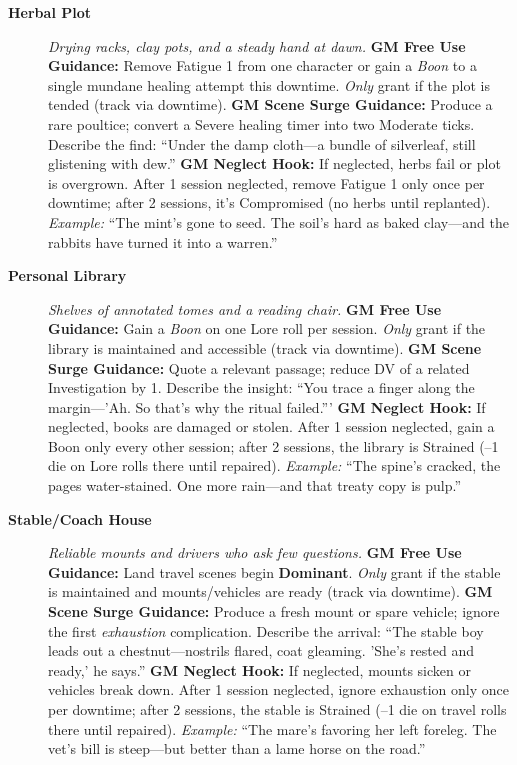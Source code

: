 \begin{description}
  \item[\textbf{Herbal Plot}]   
        \emph{Drying racks, clay pots, and a steady hand at dawn.}  
        \textbf{GM Free Use Guidance:} Remove Fatigue 1 from one character or gain a \emph{Boon} to a single mundane healing attempt this downtime. \emph{Only} grant if the plot is tended (track via downtime).  
        \textbf{GM Scene Surge Guidance:} Produce a rare poultice; convert a Severe healing timer into two Moderate ticks. Describe the find: ``Under the damp cloth---a bundle of silverleaf, still glistening with dew.''  
        \textbf{GM Neglect Hook:} If neglected, herbs fail or plot is overgrown. After 1 session neglected, remove Fatigue 1 only once per downtime; after 2 sessions, it's Compromised (no herbs until replanted).  
        \textit{Example:} ``The mint's gone to seed. The soil's hard as baked clay---and the rabbits have turned it into a warren.''  

  \item[\textbf{Personal Library}]   
        \emph{Shelves of annotated tomes and a reading chair.}  
        \textbf{GM Free Use Guidance:} Gain a \emph{Boon} on one Lore roll per session. \emph{Only} grant if the library is maintained and accessible (track via downtime).  
        \textbf{GM Scene Surge Guidance:} Quote a relevant passage; reduce DV of a related Investigation by 1. Describe the insight: ``You trace a finger along the margin---'Ah. So that's why the ritual failed.'''  
        \textbf{GM Neglect Hook:} If neglected, books are damaged or stolen. After 1 session neglected, gain a Boon only every other session; after 2 sessions, the library is Strained (--1 die on Lore rolls there until repaired).  
        \textit{Example:} ``The spine's cracked, the pages water-stained. One more rain---and that treaty copy is pulp.''  

  \item[\textbf{Stable/Coach House}]   
        \emph{Reliable mounts and drivers who ask few questions.}  
        \textbf{GM Free Use Guidance:} Land travel scenes begin \textbf{Dominant}. \emph{Only} grant if the stable is maintained and mounts/vehicles are ready (track via downtime).  
        \textbf{GM Scene Surge Guidance:} Produce a fresh mount or spare vehicle; ignore the first \emph{exhaustion} complication. Describe the arrival: ``The stable boy leads out a chestnut---nostrils flared, coat gleaming. 'She's rested and ready,' he says.''  
        \textbf{GM Neglect Hook:} If neglected, mounts sicken or vehicles break down. After 1 session neglected, ignore exhaustion only once per downtime; after 2 sessions, the stable is Strained (--1 die on travel rolls there until repaired).  
        \textit{Example:} ``The mare's favoring her left foreleg. The vet's bill is steep---but better than a lame horse on the road.''  


\end{description}
